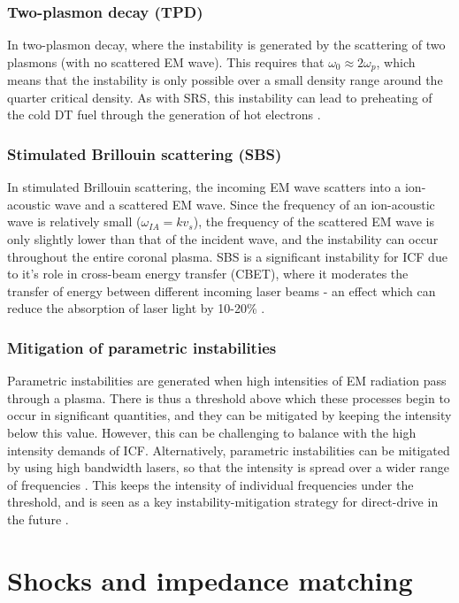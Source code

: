 \subsubsection{Two-plasmon decay (TPD)}
In two-plasmon decay, where the instability is generated by the scattering of two plasmons (with no scattered EM wave). This requires that $\omega_0 \approx 2\omega_p$, which means that the instability is only possible over a small density range around the  quarter critical density. As with SRS, this instability can lead to preheating of the cold DT fuel through the generation of hot electrons \cite{Yaakobi2000}.

\subsubsection{Stimulated Brillouin scattering (SBS)}
In stimulated Brillouin scattering, the incoming EM wave scatters into a ion-acoustic wave and a scattered EM wave. Since the frequency of an ion-acoustic wave is relatively small ($\omega_{IA} = kv_s$), the frequency of the scattered EM wave is only slightly lower than that of the incident wave, and the instability can occur throughout the entire coronal plasma. SBS is a significant instability for ICF due to it's role in cross-beam energy transfer (CBET), where it moderates the transfer of energy between different incoming laser beams - an effect which can reduce the absorption of laser light by 10-20\% \cite{Igumenshchev2012}.

\subsubsection{Mitigation of parametric instabilities}
Parametric instabilities are generated when high intensities of EM radiation pass through a plasma. There is thus a threshold above which these processes begin to occur in significant quantities, and they can be mitigated by keeping the intensity below this value. However, this can be challenging to balance with the high intensity demands of ICF. Alternatively, parametric instabilities can be mitigated by using high bandwidth lasers, so that the intensity is spread over a wider range of frequencies \cite{Follett2018}. This keeps the intensity of individual frequencies under the threshold, and is seen as a key instability-mitigation strategy for direct-drive in the future \cite{Campbell2021a}.


\section{Shocks and impedance matching}

